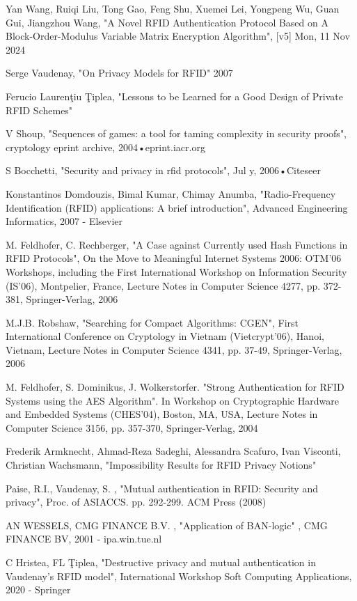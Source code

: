 \begin{thebibliography}{9}


Yan Wang, Ruiqi Liu, Tong Gao, Feng Shu, Xuemei Lei, Yongpeng Wu, Guan Gui, Jiangzhou Wang,
 "A Novel RFID Authentication Protocol Based on A Block-Order-Modulus Variable Matrix Encryption Algorithm", [v5] Mon, 11 Nov 2024

Serge Vaudenay, "On Privacy Models for RFID" 2007

Ferucio Laurenţiu Ţiplea, "Lessons to be Learned for a Good Design of Private RFID Schemes"

V Shoup, "Sequences of games: a tool for taming complexity in security proofs", cryptology eprint archive, 2004•eprint.iacr.org

S Bocchetti, "Security and privacy in rfid protocols", Jul y, 2006•Citeseer

Konstantinos Domdouzis, Bimal Kumar, Chimay Anumba, "Radio-Frequency Identification (RFID) applications: A brief introduction", Advanced Engineering Informatics, 2007 - Elsevier

M. Feldhofer, C. Rechberger, "A Case against Currently used Hash Functions in RFID Protocols", On the Move to Meaningful Internet Systems 2006: OTM'06 Workshops, including the First International Workshop on Information Security (IS'06), Montpelier, France, Lecture Notes in Computer Science 4277, pp. 372-381, Springer-Verlag, 2006

M.J.B. Robshaw, "Searching for Compact Algorithms: CGEN", First International Conference on Cryptology in Vietnam (Vietcrypt'06), Hanoi, Vietnam, Lecture Notes in Computer Science 4341, pp. 37-49, Springer-Verlag, 2006

M. Feldhofer, S. Dominikus, J. Wolkerstorfer. "Strong Authentication for RFID Systems using the AES Algorithm". In Workshop on Cryptographic Hardware and Embedded Systems (CHES'04), Boston, MA, USA, Lecture Notes in Computer Science 3156, pp. 357-370, Springer-Verlag, 2004

Frederik Armknecht, Ahmad-Reza Sadeghi, Alessandra Scafuro, Ivan Visconti, Christian Wachsmann, "Impossibility Results for RFID Privacy Notions"

Paise, R.I., Vaudenay, S. , "Mutual authentication in RFID: Security and privacy", Proc. of ASIACCS. pp. 292-299. ACM Press (2008)

AN WESSELS, CMG FINANCE B.V. , "Application of BAN-logic" , CMG FINANCE BV, 2001 - ipa.win.tue.nl

C Hristea, FL Ţiplea, "Destructive privacy and mutual authentication in Vaudenay's RFID model",  International Workshop Soft Computing Applications, 2020 - Springer

\end{thebibliography}